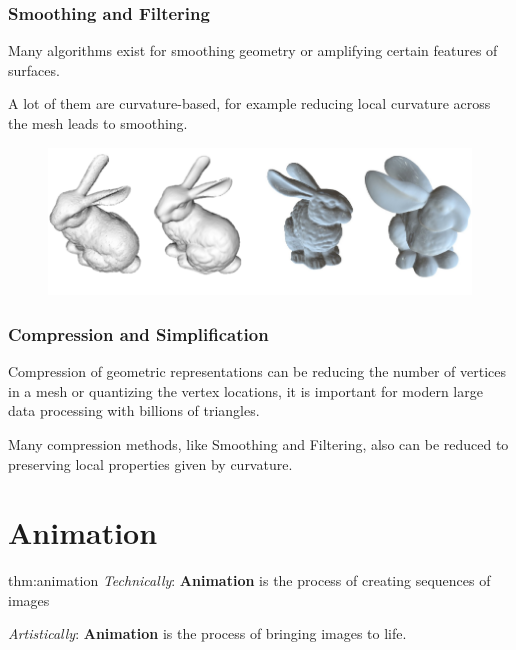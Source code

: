 \documentclass{article}
\begin{document}
\subsubsection{Smoothing and Filtering}

\vspace{5px}

Many algorithms exist for smoothing geometry or amplifying certain features of surfaces.

A lot of them are curvature-based, for example reducing local curvature across the mesh leads to smoothing.

\begin{figure}[!ht]
    \centering
    \includegraphics[width=0.5\linewidth]{images/smoothing_and_filtering.png}
\end{figure}

\vspace{10px}

\subsubsection{Compression and Simplification}

\vspace{5px}

Compression of geometric representations can be reducing the number of vertices in a mesh or quantizing the 
vertex locations, it is important for modern large data processing with billions of triangles.

\vspace{5px}

Many compression methods, like Smoothing and Filtering, also can be reduced to preserving local properties given
by curvature.


\newpage

\section{Animation}


\begin{defin}[Animation]{thm:animation}
    \textit{Technically}: \textbf{Animation} is the process of creating sequences of images

    \vspace{5px}

    \textit{Artistically}: \textbf{Animation} is the process of bringing images to life.
\end{defin}
\end{document}
